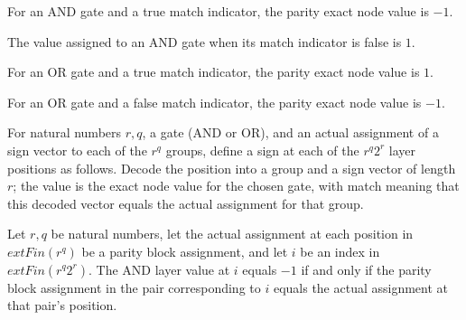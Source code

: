 \begin{theorem}
\label{FABL.parityExactNodeValue_and_true}
\leanok
{}
For an AND gate and a true match indicator, the parity exact node value is $-1$.
\end{theorem}

\begin{theorem}
\label{FABL.parityExactNodeValue_and_false}
\leanok
{}
The value assigned to an AND gate when its match indicator is false is $1$.
\end{theorem}

\begin{theorem}
\label{FABL.parityExactNodeValue_or_true}
\leanok
{}
For an OR gate and a true match indicator, the parity exact node value is $1$.
\end{theorem}

\begin{theorem}
\label{FABL.parityExactNodeValue_or_false}
\leanok
{}
For an OR gate and a false match indicator, the parity exact node value is $-1$.
\end{theorem}

\begin{definition}
\label{FABL.parityLayerValues}
\leanok
{}
For natural numbers $r,q$, a gate (AND or OR), and an actual assignment of a sign vector
to each of the $r^q$ groups, define a sign at each of the $r^q2^r$ layer positions as
follows. Decode the position into a group and a sign vector of length $r$; the value is
the exact node value for the chosen gate, with match meaning that this decoded vector
equals the actual assignment for that group.
\end{definition}

\begin{theorem}
\label{FABL.parityLayerValues_and_eq_neg_one_iff}
\leanok
{}
Let $r,q$ be natural numbers, let the actual assignment at each position in
$	ext{Fin}(r^q)$ be a parity block assignment, and let $i$ be an index in
$	ext{Fin}(r^q2^r)$. The AND layer value at $i$ equals $-1$ if and only if the parity
block assignment in the pair corresponding to $i$ equals the actual assignment at that
pair's position.
\end{theorem}

